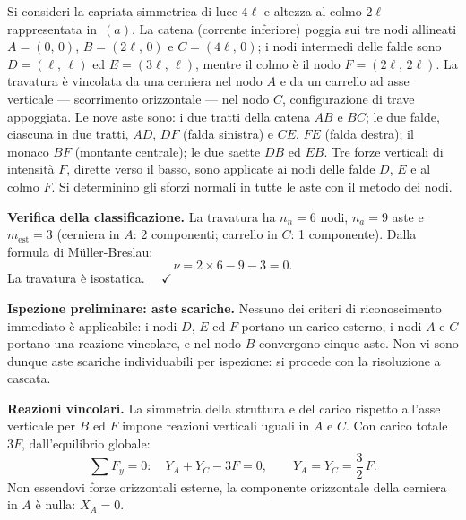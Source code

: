 \begin{esempio}\label{ese:capriata_palladiana}
	Si consideri la capriata simmetrica di luce $4\ell$
	e altezza al colmo $2\ell$ rappresentata in
	\,$(a)$. La catena
	(corrente inferiore) poggia sui tre nodi allineati
	$A = (0,\,0)$, $B = (2\ell,\,0)$ e $C = (4\ell,\,0)$;
	i nodi intermedi delle falde sono $D = (\ell,\,\ell)$
	ed $E = (3\ell,\,\ell)$, mentre il colmo è il nodo
	$F = (2\ell,\,2\ell)$. La travatura è vincolata da
	una cerniera nel nodo $A$ e da un carrello ad asse
	verticale --- scorrimento orizzontale --- nel
	nodo $C$, configurazione di trave appoggiata.
	Le nove aste sono: i due tratti della catena
	$AB$ e $BC$; le due falde, ciascuna in due tratti,
	$AD$, $DF$ (falda sinistra) e $CE$, $FE$ (falda
	destra); il monaco $BF$ (montante centrale);
	le due saette $DB$ ed $EB$.
	Tre forze verticali di intensità $F$, dirette verso
	il basso, sono applicate ai nodi delle falde $D$, $E$
	e al colmo $F$.
	Si determinino gli sforzi normali in tutte le aste
	con il metodo dei nodi.
	
	\begin{svolgimento}
		



		
		\noindent\textbf{Verifica della classificazione.}
		La travatura ha $n_n = 6$ nodi, $n_a = 9$ aste e
		$m_\text{est} = 3$ (cerniera in $A$: 2 componenti;
		carrello in $C$: 1 componente). Dalla formula di
		M\"{u}ller-Breslau:
		\[
		\nu = 2 \times 6 - 9 - 3 = 0.
		\]
		La travatura è isostatica. $\quad\checkmark$
		
		\noindent\textbf{Ispezione preliminare: aste scariche.}
		Nessuno dei criteri di riconoscimento immediato è
		applicabile: i nodi $D$, $E$ ed $F$ portano un carico
		esterno, i nodi $A$ e $C$ portano una reazione
		vincolare, e nel nodo $B$ convergono cinque aste.
		Non vi sono dunque aste scariche individuabili per
		ispezione: si procede con la risoluzione a cascata.
		
		\noindent\textbf{Reazioni vincolari.}
		La simmetria della struttura e del carico rispetto
		all'asse verticale per $B$ ed $F$ impone reazioni
		verticali uguali in $A$ e $C$. Con carico totale
		$3F$, dall'equilibrio globale:
		\[
		\sum F_y = 0:\quad
		Y_A + Y_C - 3F = 0,
		\qquad
		Y_A = Y_C = \frac{3}{2}\,F.
		\]
		Non essendovi forze orizzontali esterne, la
		componente orizzontale della cerniera in $A$ è nulla:
		$X_A = 0$.
		

\end{svolgimento}
\end{esempio}
